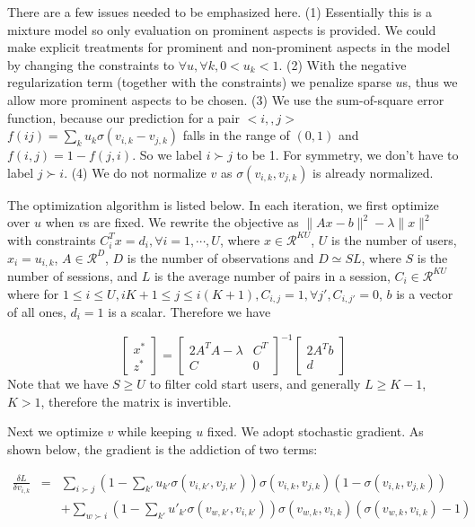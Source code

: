 \documentclass[11pt]{report}
\newcommand{\Real}{\mathcal{R}}
\begin{document}
There are a few issues needed to be emphasized here. (1) Essentially this is a mixture model so only evaluation on prominent aspects is provided. We could make explicit treatments for prominent and non-prominent aspects in the model by changing the constraints to $\forall u,\forall k, 0<u_k<1$. (2) With the negative regularization term (together with the constraints) we penalize sparse $u$s, thus we allow more prominent aspects to be chosen. (3) We use the sum-of-square error function, because our prediction for a pair $<i,,j>$$f(i j)=\sum_k u_k \sigma(v_{i,k}-v_{j,k})$ falls in the range of $(0,1)$ and $f(i,j)=1-f(j,i)$. So we label $i\succ j$ to be 1. For symmetry, we don't have to label $j\succ i$. (4) We do not normalize $v$ as $\sigma(v_{i,k}, v_{j,k})$ is already normalized.

The optimization algorithm is listed below. In each iteration, we first optimize over $u$ when $v$s are fixed. We rewrite the objective as $\|Ax-b\|^2-\lambda \|x\|^2$ with constraints $C_i^Tx=d_i, \forall i=1,\cdots,U$, where $x\in \Real^{KU}$, $U$ is the number of users, $x_i=u_{i,k}$, $A\in \Real^{D}$, $D$ is the number of observations and $D\simeq SL$, where $S$ is the number of sessions, and $L$ is the average number of pairs in a session, $C_i\in \Real^{KU}$ where for $1\leq i \leq U, iK+1\leq j \leq i(K+1), C_{i,j}=1, \forall j', C_{i,j'}=0$, $b$ is a vector of all ones, $d_i=1$ is a scalar. Therefore we have

\begin{equation}
\begin{bmatrix}
x^* \\
z^*
\end{bmatrix} = \begin{bmatrix}
2A^TA-\lambda & C^T \\
C & 0
\end{bmatrix}^{-1}
\begin{bmatrix}
2A^Tb \\
d
\end{bmatrix}
\end{equation}
Note that we have $S\geq U$ to filter cold start users, and generally $L\geq K-1$, $K>1$, therefore the matrix is invertible. 

Next we optimize $v$ while keeping $u$ fixed. We adopt stochastic gradient.  As shown below, the gradient is the addiction of two terms:

\begin{eqnarray*}
\frac{\delta L}{\delta v_{i,k}}&=&\sum_{i\succ j} (1-\sum_{k'} u_{k'}\sigma(v_{i,k'},v_{j,k'}))\sigma(v_{i,k},v_{j,k})(1-\sigma(v_{i,k},v_{j,k}))\\
&&+ \sum_{w\succ i} (1-\sum_{k'} u'_{k'}\sigma(v_{w,k'},v_{i,k'}))\sigma(v_{w,k},v_{i,k})(\sigma(v_{w,k},v_{i,k})-1)
\end{eqnarray*}
\end{document}
